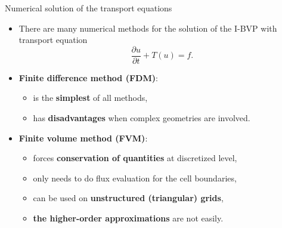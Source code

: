 \begin{frame}{Numerical solution of the transport equations}
\begin{itemize}
\item There are many numerical methods for the solution of the I-BVP with transport equation \\[-5pt]
%
\[
\frac{\partial u}{\partial t}+T(u) = f.
\]
%
\item \alert{\bf Finite difference method (FDM)}:
\begin{itemize}
	\item is the {\bf simplest} of all methods, 
	\item has {\bf disadvantages} when \alert{complex geometries} are involved.
\end{itemize}
%
\item \alert{\bf Finite volume method (FVM)}:
\begin{itemize}
	\item forces {\bf conservation of quantities} at discretized level, 
	\item only needs to do flux evaluation for the cell boundaries,
	\item can be used on {\bf unstructured (triangular) grids}, 
	\item {\bf the higher-order approximations} are not easily.
\end{itemize}

\end{itemize}
\end{frame}
